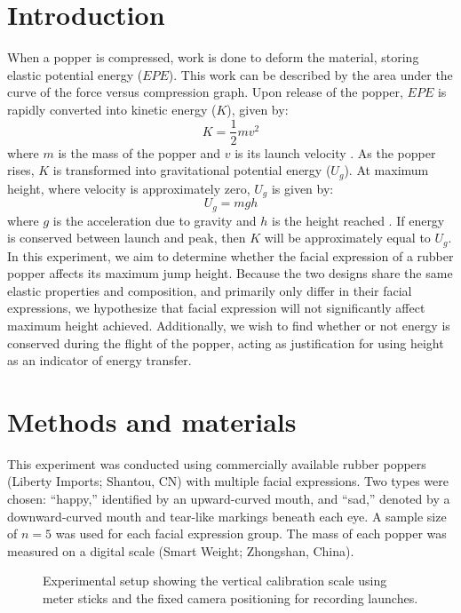 \documentclass[amsmath,amssymb,aps,endfloats,linenumbers]{revtex4-2}
\begin{document}
\section{Introduction}
When a popper is compressed, work is done to deform the material, storing elastic potential energy ($EPE$). This work can be described by the area under the curve of the force versus compression graph. Upon release of the popper, $EPE$ is rapidly converted into kinetic energy ($K$), given by:
\begin{equation}
K = \frac{1}{2}mv^2
\label{eq:ke}
\end{equation}
where $m$ is the mass of the popper and $v$ is its launch velocity \cite{tipler}. As the popper rises, $K$ is transformed into gravitational potential energy ($U_g$). At maximum height, where velocity is approximately zero, $U_g$ is given by:
\begin{equation}
U_g = mgh
\label{eq:gpe}
\end{equation}
where $g$ is the acceleration due to gravity and $h$ is the height reached \cite{tipler}. If energy is conserved between launch and peak, then $K$ will be approximately equal to $U_g$. In this experiment, we aim to determine whether the facial expression of a rubber popper affects its maximum jump height. Because the two designs share the same elastic properties and composition, and primarily only differ in their facial expressions, we hypothesize that facial expression will not significantly affect maximum height achieved. Additionally, we wish to find whether or not energy is conserved during the flight of the popper, acting as justification for using height as an indicator of energy transfer.

\section{Methods and materials}
This experiment was conducted using commercially available rubber poppers (Liberty Imports; Shantou, CN) with multiple facial expressions. Two types were chosen: ``happy,'' identified by an upward-curved mouth, and ``sad,'' denoted by a downward-curved mouth and tear-like markings beneath each eye. A sample size of $n=5$ was used for each facial expression group. The mass of each popper was measured on a digital scale (Smart Weight; Zhongshan, China). 
\begin{figure}[H]
    \centering
     
    \caption{Experimental setup showing the vertical calibration scale using meter sticks and the fixed camera positioning for recording launches.}
    \label{fig:setup}
\end{figure}
\end{document}
